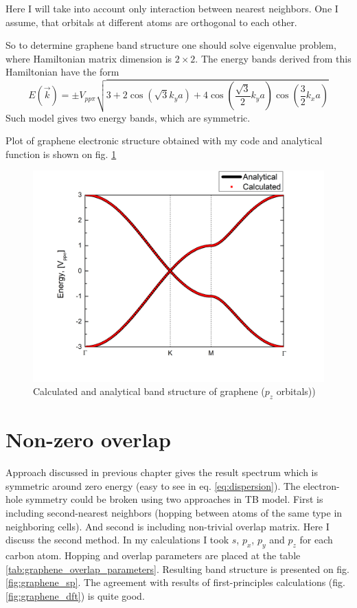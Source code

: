 Here I will take into account only interaction between nearest neighbors. One I assume, that orbitals at different atoms are orthogonal to each other.

So to determine graphene band structure one should solve eigenvalue problem, where Hamiltonian matrix dimension is $2 \times 2$. The energy bands derived from this Hamiltonian have the form \cite{wallace}
\begin{equation} \label{eq:dispersion}
	E(\vec{k}) = \pm V_{pp\pi}\sqrt{3 + 2 \cos\left(\sqrt{3} k_y a\right) + 4 \cos\left(\frac{\sqrt{3}}{2} k_y a\right) \cos\left(\frac{3}{2} k_x a\right)} 
\end{equation}
Such model gives two energy bands, which are symmetric.

Plot of graphene electronic structure obtained with my code and analytical function is shown on fig. \ref{fig:graphene_pz}
\begin{figure}[ht]
\begin{center}
  \includegraphics[width=0.6\linewidth]{img/graphene_pz}
  \caption{Calculated and analytical band structure of graphene ($p_z$ orbitals)) \label{fig:graphene_pz}}
\end{center}
\end{figure}

\section{Non-zero overlap}
\label{subsec:graphene_result}
Approach discussed in previous chapter gives the result spectrum which is symmetric around zero energy (easy to see in eq. \ref{eq:dispersion}). The electron-hole symmetry could be broken using two approaches in TB model. First is including second-nearest neighbors (hopping between atoms of the same type in neighboring cells). And second is including non-trivial overlap matrix. Here I discuss the second method.
In my calculations I took $s$, $p_x$, $p_y$ and $p_z$ for each carbon atom. Hopping and overlap parameters \cite{basics} are placed at the table \ref{tab:graphene_overlap_parameters}. Resulting band structure is presented on fig. \ref{fig:graphene_sp}. The agreement with results of first-principles calculations \cite{boukhvalov} (fig. \ref{fig:graphene_dft}) is quite good.

